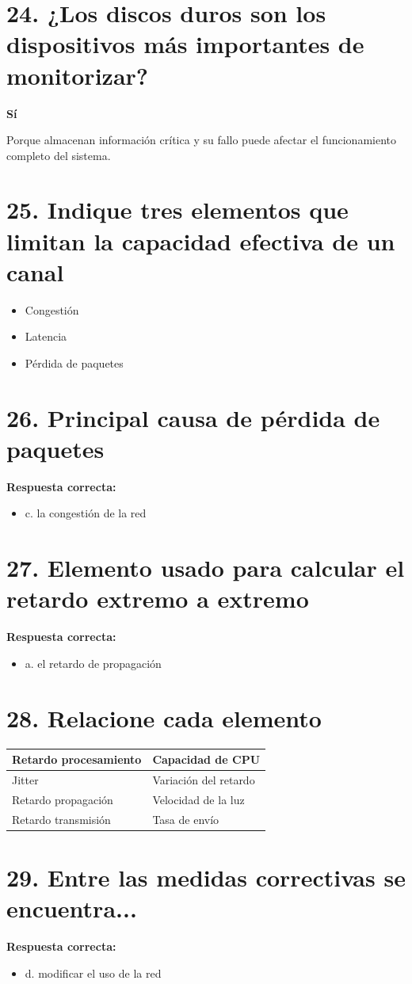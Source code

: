 \documentclass[12pt]{article}
\begin{document}
\section*{24. ¿Los discos duros son los dispositivos más importantes de monitorizar?}

\textbf{Sí}

Porque almacenan información crítica y su fallo puede afectar el funcionamiento completo del sistema.

\section*{25. Indique tres elementos que limitan la capacidad efectiva de un canal}

\begin{itemize}
    \item Congestión
    \item Latencia
    \item Pérdida de paquetes
\end{itemize}

\section*{26. Principal causa de pérdida de paquetes}

\textbf{Respuesta correcta:}

\begin{itemize}
    \item c. la congestión de la red
\end{itemize}

\section*{27. Elemento usado para calcular el retardo extremo a extremo}

\textbf{Respuesta correcta:}

\begin{itemize}
    \item a. el retardo de propagación
\end{itemize}

\section*{28. Relacione cada elemento}

\begin{center}
\begin{tabular}{|l|l|}
\hline
Retardo procesamiento & Capacidad de CPU \\
\hline
Jitter & Variación del retardo \\
\hline
Retardo propagación & Velocidad de la luz \\
\hline
Retardo transmisión & Tasa de envío \\
\hline
\end{tabular}
\end{center}

\section*{29. Entre las medidas correctivas se encuentra...}

\textbf{Respuesta correcta:}

\begin{itemize}
    \item d. modificar el uso de la red
\end{itemize}
\end{document}

